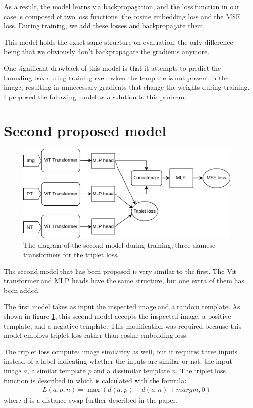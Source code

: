 \documentclass{report}[12pt, a4paper]
\begin{document}
As a result, the model learns via backpropagation, and the loss function in our case is composed of two loss functions, the cosine embedding loss and the MSE loss. During training, we add these losses and backpropagate them.

This model holds the exact same structure on evaluation, the only difference being that we obviously don't backpropagate the gradients anymore.

One significant drawback of this model is that it attempts to predict the bounding box during training even when the template is not present in the image, resulting in unnecessary gradients that change the weights during training. I proposed the following model as a solution to this problem.

\section{Second proposed model}

\begin{figure}[htp]
    \centering
    \includegraphics[width=14cm]{second_approach_diagram}
    \caption{The diagram of the second model during training, three siamese transformers for the triplet loss.}
    \label{fig:second_approach_diagram}
\end{figure}

The second model that has been proposed is very similar to the first. The Vit transformer and MLP heads have the same structure, but one extra of them has been added.

The first model takes as input the inspected image and a random template. As shown in figure \ref{fig:second_approach_diagram}, this second model accepts the inspected image, a positive template, and a negative template. This modification was required because this model employs triplet loss rather than cosine embedding loss.

The triplet loss computes image similarity as well, but it requires three inputs instead of a label indicating whether the inputs are similar or not: the input image $a$, a similar template $p$ and a dissimilar template $n$. The triplet loss function is described in \cite{triplet_loss_paper} which is calculated with the formula:
\begin{align*}
    L\left(a,p,n\right) = \max(d(a, p) - d(a, n) + margin, 0)
\end{align*}
where d is a distance swap further described in the paper\cite{triplet_loss_paper}.
\end{document}
